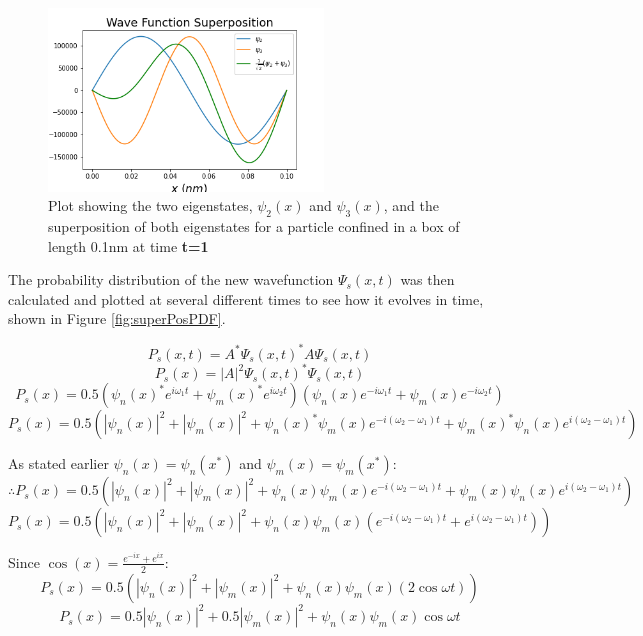 \begin{figure}[h]
    \centering
    \includegraphics[width=0.65\textwidth]{lab1/images/superpositionWave.png}
    \captionsetup{font = it, labelfont = bf, width=.91\linewidth, justification=centering}
    \caption{Plot showing the two eigenstates, $\psi_2 (x)$ and $\psi_3 (x)$, and the superposition of both eigenstates for a particle confined in a box of length 0.1nm at time \textbf{t=1}}
    \label{fig:superPosWave}
\end{figure}

The probability distribution of the new wavefunction $\Psi_s(x,t)$ was then calculated and plotted at several different times to see how it evolves in time, shown in Figure \ref{fig:superPosPDF}.

$$P_s(x, t) = A^{*} \Psi_s (x, t)^{*} A\Psi_s (x, t)$$
$$P_s(x) = \left | A \right |^2 \Psi_s (x,t)^{*} \Psi_s (x,t)$$
$$P_s(x) = 0.5 (\psi_n (x)^{*}e^{i \omega_{1} t} + \psi_m (x)^{*}e^{i \omega_{2} t}) (\psi_n (x)e^{-i \omega_{1} t} + \psi_m (x)e^{-i \omega_{2} t})$$
$$P_s(x) = 0.5 (\left | \psi_n (x) \right |^2 + \left | \psi_m (x) \right |^2 + \psi_n (x)^{*}\psi_m (x)e^{-i(\omega_{2}- \omega_{1}) t} + \psi_m (x)^{*}\psi_n (x)e^{i(\omega_{2}- \omega_{1}) t})$$

As stated earlier $\psi_n (x)=\psi_n (x^{*})$ and $\psi_m (x)=\psi_m (x^{*})$:
$$\therefore P_s(x) =  0.5 (\left | \psi_n (x) \right |^2 + \left | \psi_m (x) \right |^2 + \psi_n (x)\psi_m (x)e^{-i(\omega_{2}- \omega_{1}) t} + \psi_m (x)\psi_n (x)e^{i(\omega_{2}- \omega_{1}) t})$$
$$P_s(x) = 0.5 (\left | \psi_n (x) \right |^2 + \left | \psi_m (x) \right |^2 + \psi_n (x)\psi_m (x)(e^{-i(\omega_{2}- \omega_{1}) t} + e^{i(\omega_{2}- \omega_{1}) t}))$$

Since $\cos(x)=\frac{e^{-ix}+e^{ix}}{2}$:
$$P_s(x) = 0.5 (\left | \psi_n (x) \right |^2 + \left | \psi_m (x) \right |^2 + \psi_n (x)\psi_m (x)(2\cos\omega t))$$
$$P_s(x) = 0.5 \left | \psi_n (x) \right |^2 + 0.5\left | \psi_m (x) \right |^2 + \psi_n (x)\psi_m (x)\cos\omega t$$


